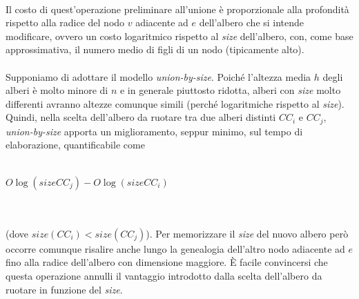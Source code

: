 \documentclass[a4paper,11pt]{report}
\begin{document}
\paragraph{}
Il costo di quest'operazione preliminare all'unione è proporzionale alla profondità rispetto alla radice del nodo $v$ adiacente ad $e$
dell'albero che si intende modificare, 
ovvero un costo logaritmico rispetto al \emph{size} dell'albero, con, come base approssimativa, il numero medio di figli di un nodo
(tipicamente alto).  
\paragraph{}
Supponiamo di adottare il modello \emph{union-by-size}.
Poiché l'altezza media $h$ degli alberi è molto minore di $n$ e in generale piuttosto ridotta, alberi con \emph{size} molto differenti
avranno altezze comunque simili (perché 
logaritmiche rispetto al \emph{size}). Quindi, nella scelta dell'albero da ruotare tra due alberi distinti  $CC_i$ e $CC_j$,
\emph{union-by-size} apporta un miglioramento, 
seppur minimo, sul tempo di elaborazione, 
quantificabile come \\\\\centerline{$O\log\left(sizeCC_j\right)-O\log\left(sizeCC_i\right)$}\\ \\(dove
$size\left(CC_i\right)<size\left(CC_j\right)$).
Per memorizzare il \emph{size} del nuovo albero però occorre comunque risalire anche lungo la genealogia dell'altro nodo adiacente ad $e$
fino alla radice dell'albero 
con dimensione maggiore.
È facile convincersi che questa operazione annulli il vantaggio introdotto dalla scelta dell'albero da ruotare in funzione del \emph{size}.
\end{document}
